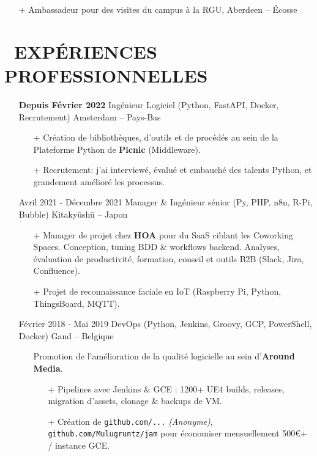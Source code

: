 \documentclass{res}
\begin{document}
\begin{resume}
\begin{itemize}
\begin{itemize}
                  \item[+]  Ambassadeur pour des visites du campus \`a la RGU, Aberdeen -- \'Ecosse
		\end{itemize} 
	\end{itemize}

\pagebreak

\section{\faBriefcase~EXP\'ERIENCES PROFESSIONNELLES}

	\begin{itemize}
		\item[] \textbf{Depuis F\'evrier 2022} \tabto{5cm} Ing\'enieur Logiciel (Python, FastAPI, Docker, Recrutement) \hfill Amsterdam -- Pays-Bas
		\begin{itemize}
			\item[+] Cr\'eation de biblioth\`eques, d'outils et de proc\'ed\'es au sein de la Plateforme Python de \textbf{Picnic} (Middleware).
			\item[+] Recrutement: j'ai interview\'e, \'evalu\'e et embauch\'e des talents Python, et grandement am\'elior\'e les processus.
		\end{itemize}
		\item[] Avril 2021 - D\'ecembre 2021 \tabto{5cm} Manager \& Ing\'enieur s\'enior (Py, PHP, n8n, R-Pi, Bubble) \hfill Kitaky\=ush\=u -- Japon
		\begin{itemize}
			\item[+] Manager de projet chez \textbf{HOA} pour du SaaS ciblant les Coworking Spaces. Conception, tuning BDD \& workflows backend. Analyses, \'evaluation de productivit\'e, formation, conseil et outils B2B (Slack, Jira, Confluence).
			\item[+] Projet de reconnaissance faciale en IoT (Raspberry Pi, Python, ThingsBoard, MQTT).
		\end{itemize}
		\item[] F\'evrier  2018 - Mai 2019 \tabto{5cm} DevOps (Python, Jenkins, Groovy, GCP, PowerShell, Docker) \hfill Gand -- Belgique
		\begin{itemize}
			\item[] Promotion de l'am\'elioration de la qualit\'e logicielle au sein d'\textbf{Around Media}.
			\begin{itemize}
				\item[+] Pipelines avec Jenkins \& GCE : 1200+ UE4 builds, releases, migration d'assets, clonage \& backups de VM.
				\item[+] Cr\'eation de \ifisanon \texttt{github.com/...} \textit{(Anonyme)}, \else \texttt{github.com/Mulugruntz/jam} \fi pour \'economiser mensuellement 500\euro+ / instance GCE.

\end{itemize}
\end{itemize}
\end{itemize}
\end{resume}
\end{document}
